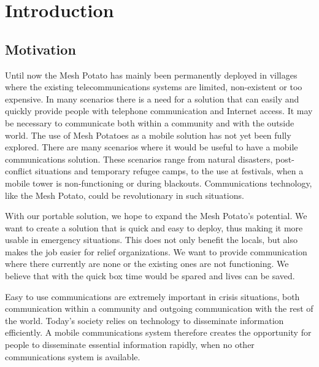 \chapter{Introduction}
\label{chp:introduction} 

\section{Motivation}
Until now the Mesh Potato has mainly been permanently deployed in villages where the existing telecommunications systems are limited, non-existent or too expensive. In many scenarios there is a need for a solution that can easily and quickly provide people with telephone communication and Internet access. It may be necessary to communicate both within a community and with the outside world. The use of Mesh Potatoes as a mobile solution has not yet been fully explored. There are many scenarios where it would be useful to have a mobile communications solution. These scenarios range from natural disasters, post-conflict situations and temporary refugee camps, to the use at festivals, when a mobile tower is non-functioning or during blackouts. Communications technology, like the Mesh Potato, could be revolutionary in such situations. 

With our portable solution, we hope to expand the Mesh Potato's potential. We want to create a solution that is quick and easy to deploy, thus making it more usable in emergency situations. This does not only benefit the locals, but also makes the job easier for relief organizations. We want to provide communication where there currently are none or the existing ones are not functioning. We believe that with the \gls{quick} box time would be spared and lives can be saved. 

Easy to use communications are extremely important in crisis situations, both communication within a community and outgoing communication with the rest of the world. Today's society relies on technology to disseminate information efficiently. A mobile communications system therefore creates the opportunity for people to disseminate essential information rapidly, when no other communications system is available. 


